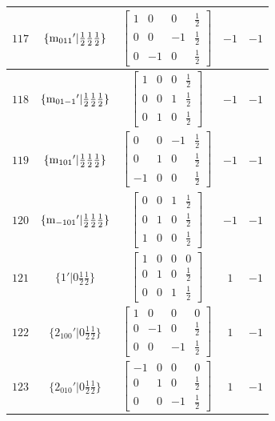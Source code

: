 \documentclass[fleqn,8pt]{jsarticle}
\begin{document}
\begin{longtable}{ccccc}
$ 117 $ & $ \{{\rm m}_{011}{}'|\frac{1}{2} \frac{1}{2} \frac{1}{2}\} $ & $ \begin{bmatrix} 1 & 0 & 0 & \frac{1}{2} \\ 0 & 0 & -1 & \frac{1}{2} \\ 0 & -1 & 0 & \frac{1}{2} \end{bmatrix} $ & $ -1 $ & $ -1 $ \\ \hline
$ 118 $ & $ \{{\rm m}_{01-1}{}'|\frac{1}{2} \frac{1}{2} \frac{1}{2}\} $ & $ \begin{bmatrix} 1 & 0 & 0 & \frac{1}{2} \\ 0 & 0 & 1 & \frac{1}{2} \\ 0 & 1 & 0 & \frac{1}{2} \end{bmatrix} $ & $ -1 $ & $ -1 $ \\ \hline
$ 119 $ & $ \{{\rm m}_{101}{}'|\frac{1}{2} \frac{1}{2} \frac{1}{2}\} $ & $ \begin{bmatrix} 0 & 0 & -1 & \frac{1}{2} \\ 0 & 1 & 0 & \frac{1}{2} \\ -1 & 0 & 0 & \frac{1}{2} \end{bmatrix} $ & $ -1 $ & $ -1 $ \\ \hline
$ 120 $ & $ \{{\rm m}_{-101}{}'|\frac{1}{2} \frac{1}{2} \frac{1}{2}\} $ & $ \begin{bmatrix} 0 & 0 & 1 & \frac{1}{2} \\ 0 & 1 & 0 & \frac{1}{2} \\ 1 & 0 & 0 & \frac{1}{2} \end{bmatrix} $ & $ -1 $ & $ -1 $ \\ \hline
$ 121 $ & $ \{1{}'|0 \frac{1}{2} \frac{1}{2}\} $ & $ \begin{bmatrix} 1 & 0 & 0 & 0 \\ 0 & 1 & 0 & \frac{1}{2} \\ 0 & 0 & 1 & \frac{1}{2} \end{bmatrix} $ & $ 1 $ & $ -1 $ \\ \hline
$ 122 $ & $ \{2{}_{100}{}'|0 \frac{1}{2} \frac{1}{2}\} $ & $ \begin{bmatrix} 1 & 0 & 0 & 0 \\ 0 & -1 & 0 & \frac{1}{2} \\ 0 & 0 & -1 & \frac{1}{2} \end{bmatrix} $ & $ 1 $ & $ -1 $ \\ \hline
$ 123 $ & $ \{2{}_{010}{}'|0 \frac{1}{2} \frac{1}{2}\} $ & $ \begin{bmatrix} -1 & 0 & 0 & 0 \\ 0 & 1 & 0 & \frac{1}{2} \\ 0 & 0 & -1 & \frac{1}{2} \end{bmatrix} $ & $ 1 $ & $ -1 $ \\ \hline

\end{longtable}
\end{document}
